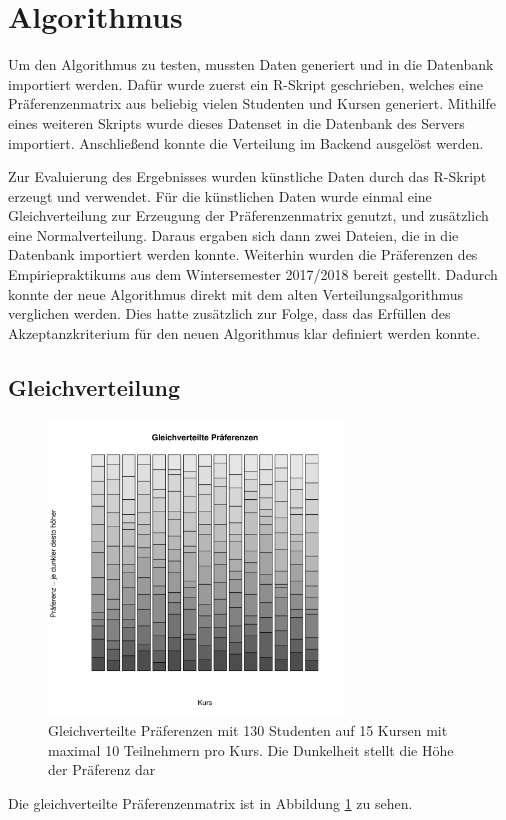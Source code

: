 	\section{Algorithmus}
	
		Um den Algorithmus zu testen, mussten Daten generiert und in die Datenbank importiert werden.
		Dafür wurde zuerst ein R-Skript geschrieben, welches eine Präferenzenmatrix aus beliebig vielen Studenten und Kursen generiert.
		Mithilfe eines weiteren Skripts wurde dieses Datenset in die Datenbank des Servers importiert.
		Anschließend konnte die Verteilung im Backend ausgelöst werden.\newline
		
		Zur Evaluierung des Ergebnisses wurden künstliche Daten durch das R-Skript erzeugt und verwendet.
		Für die künstlichen Daten wurde einmal eine Gleichverteilung zur Erzeugung der Präferenzenmatrix genutzt, und zusätzlich eine Normalverteilung.
		Daraus ergaben sich dann zwei Dateien, die in die Datenbank importiert werden konnte.\newline
		Weiterhin wurden die Präferenzen des Empiriepraktikums aus dem Wintersemester 2017/2018 bereit gestellt.
		Dadurch konnte der neue Algorithmus direkt mit dem alten Verteilungsalgorithmus verglichen werden.
		Dies hatte zusätzlich zur Folge, dass das Erfüllen des Akzeptanzkriterium für den neuen Algorithmus klar definiert werden konnte.
		
		\subsection{Gleichverteilung}
	
			\begin{figure}
				\centering
				\includegraphics[width=0.7\textwidth]{./testing/images/EqualDistPreferencesDist.jpg}
				\caption{Gleichverteilte Präferenzen mit 130 Studenten auf 15 Kursen mit maximal 10 Teilnehmern pro Kurs. Die Dunkelheit stellt die Höhe der Präferenz dar}
				\label{fig:test_equal_distribution}
			\end{figure}
			Die gleichverteilte Präferenzenmatrix ist in Abbildung \ref{fig:test_equal_distribution} zu sehen.
			
